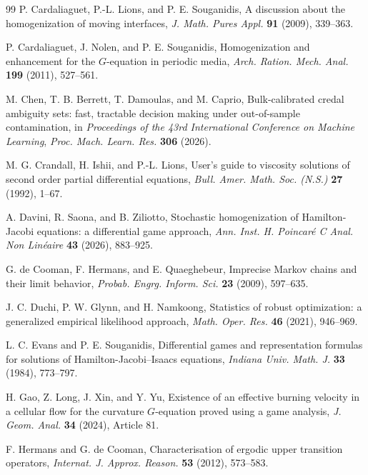 \documentclass[11pt,reqno,noamsfonts]{amsart}
\theoremstyle{definition}
\theoremstyle{remark}
\begin{document}
\begin{thebibliography}{99}
P. Cardaliaguet, P.-L. Lions, and P. E. Souganidis,
A discussion about the homogenization of moving interfaces,
\emph{J. Math. Pures Appl.} \textbf{91} (2009), 339--363.

P. Cardaliaguet, J. Nolen, and P. E. Souganidis,
Homogenization and enhancement for the $G$-equation in periodic media,
\emph{Arch. Ration. Mech. Anal.} \textbf{199} (2011), 527--561.

M. Chen, T. B. Berrett, T. Damoulas, and M. Caprio,
Bulk-calibrated credal ambiguity sets: fast, tractable decision making
under out-of-sample contamination,
in \emph{Proceedings of the 43rd International Conference on Machine
Learning},
\emph{Proc. Mach. Learn. Res.} \textbf{306} (2026).

M. G. Crandall, H. Ishii, and P.-L. Lions,
User's guide to viscosity solutions of second order partial
differential equations,
\emph{Bull. Amer. Math. Soc. (N.S.)}
\textbf{27} (1992), 1--67.

A. Davini, R. Saona, and B. Ziliotto,
Stochastic homogenization of Hamilton-Jacobi equations: a differential game approach,
\emph{Ann. Inst. H. Poincar\'e C Anal. Non Lin\'eaire} \textbf{43} (2026), 883--925.

G. de Cooman, F. Hermans, and E. Quaeghebeur,
Imprecise Markov chains and their limit behavior,
\emph{Probab. Engrg. Inform. Sci.} \textbf{23} (2009), 597--635.

J. C. Duchi, P. W. Glynn, and H. Namkoong,
Statistics of robust optimization: a generalized empirical likelihood approach,
\emph{Math. Oper. Res.} \textbf{46} (2021), 946--969.


L. C. Evans and P. E. Souganidis,
Differential games and representation formulas for solutions of Hamilton-Jacobi--Isaacs equations,
\emph{Indiana Univ. Math. J.} \textbf{33} (1984), 773--797.

H. Gao, Z. Long, J. Xin, and Y. Yu,
Existence of an effective burning velocity in a cellular flow for the curvature $G$-equation proved using a game analysis,
\emph{J. Geom. Anal.} \textbf{34} (2024), Article 81.

F. Hermans and G. de Cooman,
Characterisation of ergodic upper transition operators,
\emph{Internat. J. Approx. Reason.} \textbf{53} (2012), 573--583.


\end{thebibliography}
\end{document}

